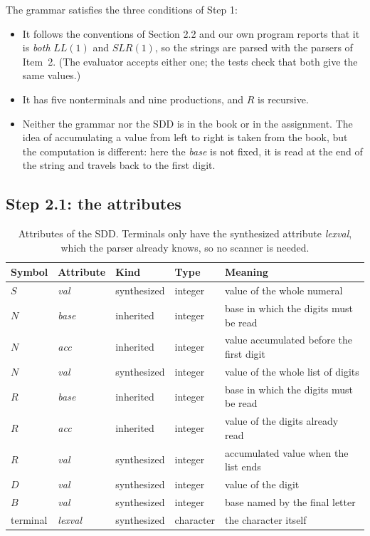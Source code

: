 \documentclass[11pt]{article}
\begin{document}
The grammar satisfies the three conditions of Step 1:

\begin{itemize}
  \item[\textbf{G1}] It follows the conventions of Section 2.2 and our own program
        reports that it is \emph{both} $LL(1)$ and $SLR(1)$, so the strings are parsed
        with the parsers of Item~2. (The evaluator accepts either one; the tests check
        that both give the same values.)
  \item[\textbf{G2}] It has five nonterminals and nine productions, and $R$ is
        recursive.
  \item[\textbf{G3}] Neither the grammar nor the SDD is in the book or in the
        assignment. The idea of accumulating a value from left to right is taken from the
        book, but the computation is different: here the \emph{base} is not fixed, it is
        read at the end of the string and travels back to the first digit.
\end{itemize}

\subsection{Step 2.1: the attributes}

\begin{table}[h]
\centering
\small
\begin{tabular}{@{}llllp{6.2cm}@{}}
\toprule
\textbf{Symbol} & \textbf{Attribute} & \textbf{Kind} & \textbf{Type} & \textbf{Meaning} \\
\midrule
$S$ & \textit{val}    & synthesized & integer   & value of the whole numeral \\
$N$ & \textit{base}   & inherited   & integer   & base in which the digits must be read \\
$N$ & \textit{acc}    & inherited   & integer   & value accumulated before the first digit \\
$N$ & \textit{val}    & synthesized & integer   & value of the whole list of digits \\
$R$ & \textit{base}   & inherited   & integer   & base in which the digits must be read \\
$R$ & \textit{acc}    & inherited   & integer   & value of the digits already read \\
$R$ & \textit{val}    & synthesized & integer   & accumulated value when the list ends \\
$D$ & \textit{val}    & synthesized & integer   & value of the digit \\
$B$ & \textit{val}    & synthesized & integer   & base named by the final letter \\
terminal & \textit{lexval} & synthesized & character & the character itself \\
\bottomrule
\end{tabular}
\caption{Attributes of the SDD. Terminals only have the synthesized attribute
\textit{lexval}, which the parser already knows, so no scanner is needed.}
\label{tab:attributes}
\end{table}
\end{document}
